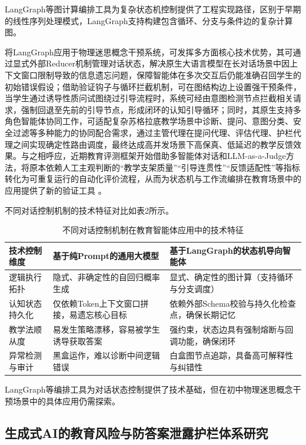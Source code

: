 LangGraph等图计算编排工具为复杂状态机控制提供了工程实现路径\citep{ref32}，区别于早期的线性序列处理模式，LangGraph支持构建包含循环、分支与条件边的复杂计算图\citep{ref32}。

将LangGraph应用于物理迷思概念干预系统，可发挥多方面核心技术优势，其可通过显式外部Reducer机制管理对话状态，解决原生大语言模型在长对话场景中因上下文窗口限制导致的信息遗忘问题，保障智能体在多次交互后仍能准确召回学生的初始错误假设\citep{ref33}；借助验证钩子与循环拦截机制，可在图结构边上设置强干预条件，当学生通过诱导性质问试图绕过引导流程时，系统可经由意图检测节点拦截相关请求，强制回退至先前的引导节点，形成闭环的认知引导循环\citep{ref34}；同时，其原生支持多角色智能体协同工作，可适配复杂苏格拉底教学场景中诊断、提问、意图分类、安全过滤等多种能力的协同配合需求，通过主管代理在提问代理、评估代理、护栏代理之间实现确定性路由调度，最终达成高并发场景下高保真、低延迟的教学反馈效果\citep{ref35}。与之相呼应，近期教育评测框架开始借助多智能体对话和LLM-as-a-Judge方法，将原本依赖人工主观判断的“教学支架质量”“引导连贯性”“反馈适配性”等指标转化为可重复运行的自动化评价流程，从而为状态机与工作流编排在教育场景中的应用提供了新的验证工具 \citep{shi2025educationq,seo2025llmevaluators,weib2025elmes}。

不同对话控制机制的技术特征对比如表2所示。

\begin{table}[htbp]
\caption{不同对话控制机制在教育智能体应用中的技术特征}
\label{tab:2}
\begin{tabularx}{\textwidth}{|X|X|X|}
\hline
技术控制维度 & 基于纯Prompt的通用大模型 & 基于LangGraph的状态机导向智能体 \\
\hline
逻辑执行拓扑 & 隐式、非确定性的自回归概率生成 & 显式、确定性的图计算（支持循环与分支调度） \citep{ref32} \\
\hline
认知状态持久化 & 仅依赖Token上下文窗口拼接，易遗忘核心目标 & 依赖外部Schema校验与持久化检查点，确保长期记忆 \citep{ref55} \\
\hline
教学法顺从度 & 易发生策略漂移，容易被学生诱导获取答案 & 强约束，状态边具有强制熔断与回调功能，确保闭环 \citep{ref34} \\
\hline
异常检测与审计 & 黑盒运作，难以诊断中间逻辑错误 & 白盒图节点追踪，具备高可解释性与纠错性 \citep{ref35} \\
\hline
\end{tabularx}
\end{table}

LangGraph等编排工具为对话状态控制提供了技术基础，但在初中物理迷思概念干预场景中的具体应用仍需探索。

\subsection{生成式AI的教育风险与防答案泄露护栏体系研究}

